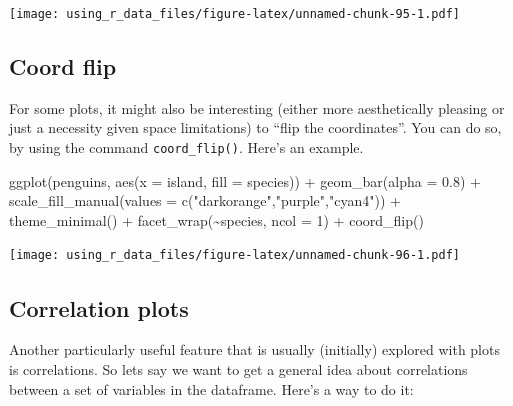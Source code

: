 \documentclass[
]{book}
\newenvironment{Shaded}{\begin{snugshade}}{\end{snugshade}}
\newcommand{\AttributeTok}[1]{\textcolor[rgb]{0.77,0.63,0.00}{#1}}
\newcommand{\DecValTok}[1]{\textcolor[rgb]{0.00,0.00,0.81}{#1}}
\newcommand{\FloatTok}[1]{\textcolor[rgb]{0.00,0.00,0.81}{#1}}
\newcommand{\FunctionTok}[1]{\textcolor[rgb]{0.00,0.00,0.00}{#1}}
\newcommand{\NormalTok}[1]{#1}
\newcommand{\SpecialCharTok}[1]{\textcolor[rgb]{0.00,0.00,0.00}{#1}}
\newcommand{\StringTok}[1]{\textcolor[rgb]{0.31,0.60,0.02}{#1}}
\begin{document}
\texttt{[image: using\_r\_data\_files/figure-latex/unnamed-chunk-95-1.pdf]}

\hypertarget{coord-flip}{%
\subsection{Coord flip}\label{coord-flip}}

For some plots, it might also be interesting (either more aesthetically pleasing or just a necessity given space limitations) to ``flip the coordinates''.
You can do so, by using the command \texttt{coord\_flip()}.
Here's an example.

\begin{Shaded}
\begin{Highlighting}[]
\FunctionTok{ggplot}\NormalTok{(penguins, }\FunctionTok{aes}\NormalTok{(}\AttributeTok{x =}\NormalTok{ island, }\AttributeTok{fill =}\NormalTok{ species)) }\SpecialCharTok{+}
  \FunctionTok{geom\_bar}\NormalTok{(}\AttributeTok{alpha =} \FloatTok{0.8}\NormalTok{) }\SpecialCharTok{+}
  \FunctionTok{scale\_fill\_manual}\NormalTok{(}\AttributeTok{values =} \FunctionTok{c}\NormalTok{(}\StringTok{"darkorange"}\NormalTok{,}\StringTok{"purple"}\NormalTok{,}\StringTok{"cyan4"}\NormalTok{)) }\SpecialCharTok{+}
  \FunctionTok{theme\_minimal}\NormalTok{() }\SpecialCharTok{+}
  \FunctionTok{facet\_wrap}\NormalTok{(}\SpecialCharTok{\textasciitilde{}}\NormalTok{species, }\AttributeTok{ncol =} \DecValTok{1}\NormalTok{) }\SpecialCharTok{+}
  \FunctionTok{coord\_flip}\NormalTok{()}
\end{Highlighting}
\end{Shaded}

\texttt{[image: using\_r\_data\_files/figure-latex/unnamed-chunk-96-1.pdf]}

\hypertarget{correlation-plots}{%
\subsection{Correlation plots}\label{correlation-plots}}

Another particularly useful feature that is usually (initially) explored with plots is correlations.
So lets say we want to get a general idea about correlations between a set of variables in the dataframe.
Here's a way to do it:
\end{document}
